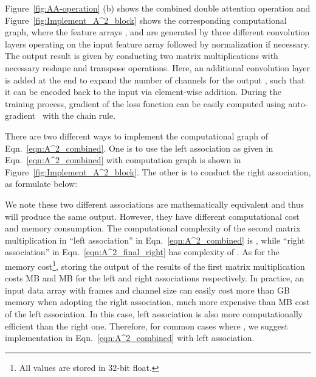 \documentclass{article}
\begin{document}
Figure~\ref{fig:AA-operation} (b) shows the combined double attention operation and Figure~\ref{fig:Implement_A^2_block} shows the corresponding computational graph, where the feature arrays ,  and  are generated by three different convolution layers operating on the input feature array  followed by  normalization if necessary. The output result  is given by conducting two matrix multiplications with necessary reshape and transpose operations. Here, an additional convolution layer is added at the end to expand the number of channels for the output , such that it can be encoded back to the input  via element-wise addition. During the training process, gradient of the loss function can be easily computed using  auto-gradient~\cite{chen2015mxnet,paszke2017pytorch} with the chain rule.

There are two different ways to implement the computational graph of Eqn.~\eqref{eqn:A^2_combined}. One is to use the left association as given in Eqn.~\eqref{eqn:A^2_combined} with computation graph is shown in Figure~\ref{fig:Implement_A^2_block}. The other is to conduct the right association, as formulate below:

We note these two different associations are mathematically equivalent and thus will produce the same output. However, they have different computational cost and memory consumption. The computational complexity of the second matrix multiplication  in ``left association'' in Eqn.~\eqref{eqn:A^2_combined} is , while  ``right association''  in Eqn.~\eqref{eqn:A^2_final_right} has complexity of . As for the memory cost\footnote{All values are stored in 32-bit float.},  storing the output of the results of the first matrix multiplication costs  MB and MB for the left and right associations  respectively. In practice, an input data array  with   frames  and  channel size can easily cost more than GB memory when adopting the right association, much more expensive than  MB cost of the left association. In this case, left association is also more computationally efficient than the right one. Therefore, for common cases where , we suggest implementation in Eqn.~\eqref{eqn:A^2_combined} with left  association. 
\end{document}
